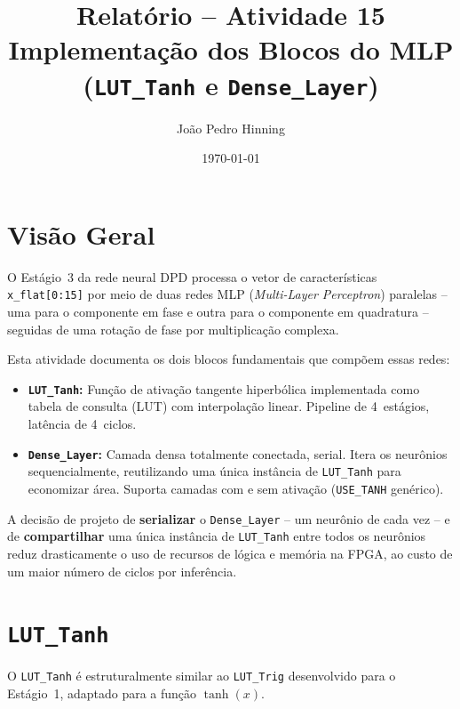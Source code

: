 \documentclass[a4paper,12pt]{article}
\title{Relat\'orio -- Atividade 15 \\
       \large Implementa\c{c}\~ao dos Blocos do MLP (\texttt{LUT\_Tanh} e \texttt{Dense\_Layer})}
\author{Jo\~ao Pedro Hinning}
\date{\today}
\begin{document}
\maketitle
\thispagestyle{fancy}

\section{Vis\~ao Geral}

O Est\'agio~3 da rede neural DPD processa o vetor de caracter\'isticas \texttt{x\_flat[0:15]} por meio de duas redes MLP (\textit{Multi-Layer Perceptron}) paralelas -- uma para o componente em fase e outra para o componente em quadratura -- seguidas de uma rota\c{c}\~ao de fase por multiplica\c{c}\~ao complexa.

Esta atividade documenta os dois blocos fundamentais que comp\~oem essas redes:

\begin{itemize}
    \item \textbf{\texttt{LUT\_Tanh}:} Fun\c{c}\~ao de ativa\c{c}\~ao tangente hiperb\'olica implementada como tabela de consulta (LUT) com interpola\c{c}\~ao linear. Pipeline de 4~est\'agios, lat\^encia de 4~ciclos.
    \item \textbf{\texttt{Dense\_Layer}:} Camada densa totalmente conectada, serial. Itera os neur\^onios sequencialmente, reutilizando uma \'unica inst\^ancia de \texttt{LUT\_Tanh} para economizar \'area. Suporta camadas com e sem ativa\c{c}\~ao (\texttt{USE\_TANH} gen\'erico).
\end{itemize}

A decis\~ao de projeto de \textbf{serializar} o \texttt{Dense\_Layer} -- um neur\^onio de cada vez -- e de \textbf{compartilhar} uma \'unica inst\^ancia de \texttt{LUT\_Tanh} entre todos os neur\^onios reduz drasticamente o uso de recursos de l\'ogica e mem\'oria na FPGA, ao custo de um maior n\'umero de ciclos por infer\^encia.


\section{\texttt{LUT\_Tanh}}

O \texttt{LUT\_Tanh} \'e estruturalmente similar ao \texttt{LUT\_Trig} desenvolvido para o Est\'agio~1, adaptado para a fun\c{c}\~ao $\tanh(x)$.
\end{document}
